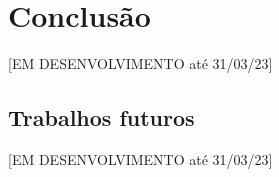 \chapter{Conclusão}
[EM DESENVOLVIMENTO até 31/03/23]

\section{Trabalhos futuros}
[EM DESENVOLVIMENTO até 31/03/23]





